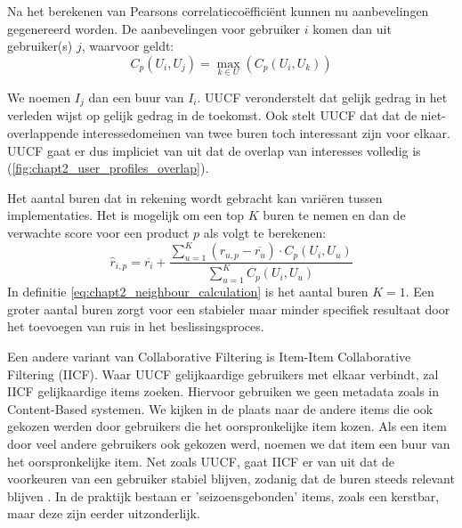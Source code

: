 Na het berekenen van Pearsons correlatiecoëfficiënt kunnen nu aanbevelingen gegenereerd worden. De aanbevelingen voor gebruiker $i$ komen dan uit gebruiker(s) $j$, waarvoor geldt:
\begin{equation}
    C_p(U_i, U_j) = \max_{k \in U}(C_p(U_i, U_k))    
    \label{eq:chapt2_neighbour_calculation}
\end{equation}

We noemen $I_j$ dan een buur van $I_i$. UUCF veronderstelt dat gelijk gedrag in het verleden wijst op gelijk gedrag in de toekomst. Ook stelt UUCF dat dat de niet-overlappende interessedomeinen van twee buren toch interessant zijn voor elkaar. UUCF gaat er dus impliciet van uit dat de overlap van interesses volledig is (\autoref{fig:chapt2_user_profiles_overlap}).


Het aantal buren dat in rekening wordt gebracht kan variëren tussen implementaties. Het is mogelijk om een top $K$ buren te nemen en dan de verwachte score voor een product $p$ als volgt te berekenen:
\begin{equation}
    \hat{r}_{i, p} = \overline{r_i} + \frac{\sum_{u=1}^{K}(r_{u, p} - \overline{r_u}) \cdot C_p(U_i, U_u)}{\sum_{u=1}^{K} C_p(U_i, U_u)}
    \label{eq:chapt2_uucf_finding_predictions_from_neighbours}
\end{equation}
In definitie \ref{eq:chapt2_neighbour_calculation} is het aantal buren $K = 1$. Een groter aantal buren zorgt voor een stabieler maar minder specifiek resultaat door het toevoegen van ruis in het beslissingsproces. \cite{cursus_hs8}

Een andere variant van Collaborative Filtering is Item-Item Collaborative Filtering (IICF). Waar UUCF gelijkaardige gebruikers met elkaar verbindt, zal IICF gelijkaardige items zoeken. \cite{IICF_original_paper} Hiervoor gebruiken we geen metadata zoals in Content-Based systemen. We kijken in de plaats naar de andere items die ook gekozen werden door gebruikers die het oorspronkelijke item kozen. Als een item door veel andere gebruikers ook gekozen werd, noemen we dat item een buur van het oorspronkelijke item. Net zoals UUCF, gaat IICF er van uit dat de voorkeuren van een gebruiker stabiel blijven, zodanig dat de buren steeds relevant blijven \cite{cursus_hs9}. In de praktijk bestaan er 'seizoensgebonden' items, zoals een kerstbar, maar deze zijn eerder uitzonderlijk.

